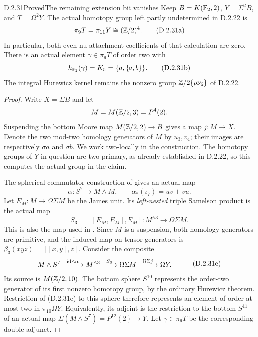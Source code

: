 \begin{claim}{D.2.31}{Proved}{The remaining extension bit vanishes}
Keep $B=K(\mathbb F_2,2)$, $Y=\Sigma^2B$, and $T=\Omega^2Y$.
The actual homotopy group left partly undetermined in
\textup{D.2.22} is
\[
       \pi_9T=\pi_{11}Y\cong(\mathbb Z/2)^4.
       \tag{D.2.31a}
\]
In particular, both even-nu attachment coefficients of that
calculation are zero. There is an actual element
$\gamma\in\pi_9T$ of order two with
\[
       h_{\mathbb F_2}(\gamma)=K_5=\{a,\{a,b\}\}.
       \tag{D.2.31b}
\]
The integral Hurewicz kernel remains the nonzero group
$\mathbb Z/2\{\rho\nu_6\}$ of \textup{D.2.22}.
\end{claim}
\begin{proof}
Write $X=\Sigma B$ and let
\[
       M=M(\mathbb Z/2,3)=P^4(2).
\]
Suspending the bottom Moore map $M(\mathbb Z/2,2)\to B$
gives a map $j:M\to X$. Denote the two mod-two homology
generators of $M$ by $u_3,v_4$; their images are respectively
$\sigma a$ and $\sigma b$. We work two-locally in the
construction. The homotopy groups of $Y$ in question are
two-primary, as already established in \textup{D.2.22}, so
this computes the actual group in the claim.

The spherical commutator construction of
\cite[Proposition~2.1, pp.~3249--3250]{I_ChenWu2013}
gives an actual map
\[
 \alpha:S^7\longrightarrow M\wedge M,
 \qquad \alpha_*(\iota_7)=uv+vu.
 \tag{D.2.31c}
\]
Let $E_M:M\to\Omega\Sigma M$ be the James unit. Its
\emph{left-nested} triple Samelson product is the actual map
\[
 S_3=[[E_M,E_M],E_M]:M^{\wedge3}\longrightarrow\Omega\Sigma M.
 \tag{D.2.31d}
\]
This is also the map used in
\cite[Section~1 and the proof of Theorem~1.6]{I_Wu1998}.
Since $M$ is a suspension, both homology generators are
primitive, and the induced map on tensor generators is
$\beta_3(xyz)=[[x,y],z]$. Consider the composite
\[
\begin{split}
 M\wedge S^7
 &\xrightarrow{\ \mathrm{id}\wedge\alpha\ } M^{\wedge3}
 \xrightarrow{\ S_3\ }\Omega\Sigma M
 \xrightarrow{\ \Omega\Sigma j\ }\Omega Y.
\end{split}
 \tag{D.2.31e}
\]
Its source is $M(\mathbb Z/2,10)$. The bottom sphere $S^{10}$
represents the order-two generator of its first nonzero
homotopy group, by the ordinary Hurewicz theorem. Restriction
of \textup{(D.2.31e)} to this sphere therefore represents an
element of order at most two in $\pi_{10}\Omega Y$.
Equivalently, its adjoint is the restriction to the bottom
$S^{11}$ of an actual map
$\Sigma(M\wedge S^7)=P^{12}(2)\to Y$.
Let $\gamma\in\pi_9T$ be the corresponding double adjunct.


\end{proof}

